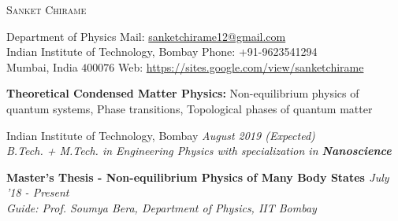 \documentclass[10pt]{article}%
\newcommand{\xfilll}[2][1ex]{
\dimen0=#2\advance\dimen0 by #1
\leaders\hrule height \dimen0 depth -#1\hfill}
\begin{document}
\begin{center}
\huge{\textsc{Sanket Chirame}}\\
\vspace{1.5mm}
\end{center}
Department of Physics  \hfill Mail: \href{mailto:sanketchirame12@gmail.com}{sanketchirame12@gmail.com}\\
Indian Institute of Technology, Bombay \hfill Phone: +91-9623541294\\
Mumbai, India $400 076$ \hfill Web: \url{https://sites.google.com/view/sanketchirame}\\
\vspace{2mm}
{%
{}
\vspace{-2mm}
\textbf{Theoretical Condensed Matter Physics:} Non-equilibrium physics of quantum systems, Phase transitions, Topological phases of quantum matter
\vspace{-1mm}
Indian Institute of Technology, Bombay \hfill \textit{August 2019 (Expected)}\\
{\em B.Tech. + M.Tech. in Engineering Physics with specialization in \textbf{Nanoscience}}



 \vspace{-3mm}

{\flushleft \bf \large{Master's Thesis - Non-equilibrium Physics of Many Body States }}  \hfill {{{\textit{July '18 - Present}}}} \\
{\em Guide: Prof. Soumya Bera, Department of Physics, IIT Bombay} 

}
\end{document}

